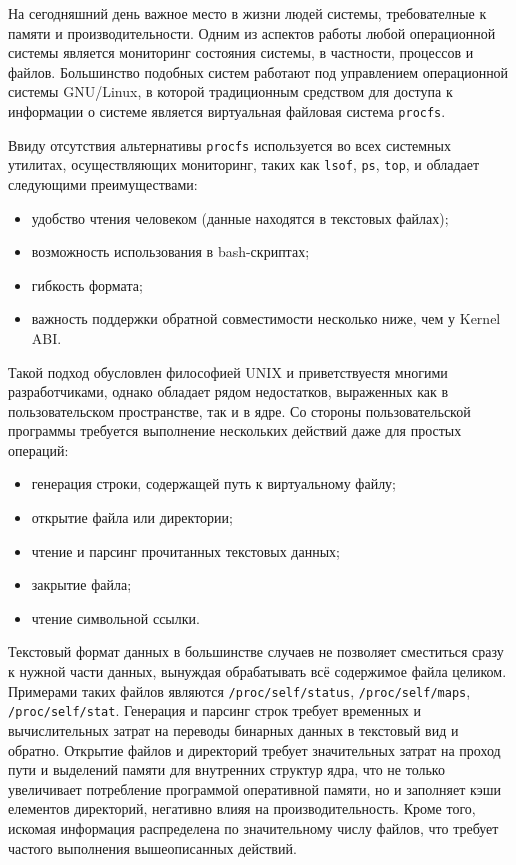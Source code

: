\label{sec:intro}
На сегодняшний день важное место в жизни людей системы, требователные к памяти и
производительности. Одним из аспектов работы любой операционной системы является
мониторинг состояния системы, в частности, процессов и файлов. Большинство
подобных систем работают под управлением операционной системы GNU/Linux, в
которой традиционным средством для доступа к информации о системе является
виртуальная файловая система \texttt{procfs}.

Ввиду отсутствия альтернативы \texttt{procfs} используется во всех системных
утилитах, осуществляющих мониторинг, таких как \texttt{lsof}, \texttt{ps},
\texttt{top}, и обладает следующими преимуществами:

\begin{itemize}
\item удобство чтения человеком (данные находятся в текстовых файлах);
\item возможность использования в bash-скриптах;
\item гибкость формата;
\item важность поддержки обратной совместимости несколько ниже, чем у Kernel ABI.
\end{itemize}

Такой подход обусловлен философией UNIX и приветствуестя многими разработчиками,
однако обладает рядом недостатков, выраженных как в пользовательском
пространстве, так и в ядре. Со стороны пользовательской программы требуется
выполнение нескольких действий даже для простых операций:

\begin{itemize}
\item генерация строки, содержащей путь к виртуальному файлу;
\item открытие файла или директории;
\item чтение и парсинг прочитанных текстовых данных;
\item закрытие файла;
\item чтение символьной ссылки.
\end{itemize}

Текстовый формат данных в большинстве случаев не позволяет сместиться сразу к
нужной части данных, вынуждая обрабатывать всё содержимое файла целиком.
Примерами таких файлов являются \texttt{/proc/self/status},
\texttt{/proc/self/maps}, \texttt{/proc/self/stat}.
Генерация и парсинг строк требует временных и вычислительных затрат на переводы
бинарных данных в текстовый вид и обратно. Открытие файлов и директорий требует
значительных затрат на проход пути и выделений памяти для внутренних структур
ядра, что не только увеличивает потребление программой оперативной памяти, но и
заполняет кэши елементов директорий, негативно влияя на производительность.
Кроме того, искомая информация распределена по значительному числу файлов, что
требует частого выполнения вышеописанных действий.

